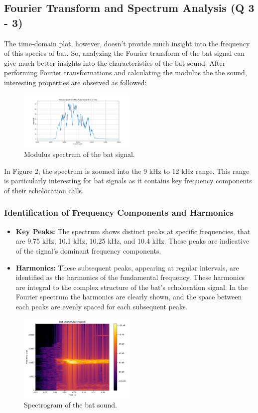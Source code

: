 \documentclass[twocolumn]{article}[ht]
\begin{document}
\subsection{Fourier Transform and Spectrum Analysis (Q 3 - 3)}
The time-domain plot, however, doesn't provide much insight into the frequency of this species of bat. So, analyzing the Fourier transform of the bat signal can give much better insights into the characteristics of the bat sound. After performing Fourier transformations and calculating the modulus the the sound, interesting properties are observed as followed:

\begin{figure}[ht]
\centering
\includegraphics[width=0.5\textwidth]{modulus_spectrum.png}
\caption{Modulus spectrum of the bat signal.}
\end{figure}

In Figure 2, the spectrum is zoomed into the 9 kHz to 12 kHz range. This range is particularly interesting for bat signals as it contains key frequency components of their echolocation calls.

\subsubsection*{Identification of Frequency Components and Harmonics}
\begin{itemize}
    \item \textbf{Key Peaks:} The spectrum shows distinct peaks at specific frequencies, that are 9.75 kHz, 10.1 kHz, 10.25 kHz, and 10.4 kHz. These peaks are indicative of the signal's dominant frequency components.
        
    \item \textbf{Harmonics:} These subsequent peaks, appearing at regular intervals, are identified as the harmonics of the fundamental frequency. These harmonics are integral to the complex structure of the bat's echolocation signal. In the Fourier spectrum the harmonics are clearly shown, and the space between each peaks are evenly spaced for each subsequent peaks.
\end{itemize}

\begin{figure}[ht]
    \centering
    \includegraphics[width=0.5\textwidth]{spectrogram.png}
    \caption{Spectrogram of the bat sound.}
    \label{fig:spectrogram}
\end{figure}
\end{document}
